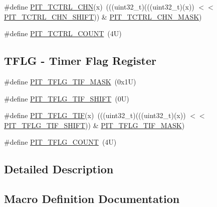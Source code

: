 \begin{DoxyCompactItemize}
\item 
\#define \mbox{\hyperlink{group___p_i_t___register___masks_gaeab3c9394c0312620a55449b2daeeaf8}{P\+I\+T\+\_\+\+T\+C\+T\+R\+L\+\_\+\+C\+HN}}(x)~(((uint32\+\_\+t)(((uint32\+\_\+t)(x)) $<$$<$ \mbox{\hyperlink{group___p_i_t___register___masks_ga9a1c8aa25a05c9b2c9503a003fa8d24d}{P\+I\+T\+\_\+\+T\+C\+T\+R\+L\+\_\+\+C\+H\+N\+\_\+\+S\+H\+I\+FT}})) \& \mbox{\hyperlink{group___p_i_t___register___masks_ga734e2e947c649d50b9ca46405e451c2b}{P\+I\+T\+\_\+\+T\+C\+T\+R\+L\+\_\+\+C\+H\+N\+\_\+\+M\+A\+SK}})
\item 
\#define \mbox{\hyperlink{group___p_i_t___register___masks_gaf5d79447f057663c2cf041cb472bd2b3}{P\+I\+T\+\_\+\+T\+C\+T\+R\+L\+\_\+\+C\+O\+U\+NT}}~(4\+U)
\end{DoxyCompactItemize}
\subsection*{T\+F\+LG -\/ Timer Flag Register}
\begin{DoxyCompactItemize}
\item 
\#define \mbox{\hyperlink{group___p_i_t___register___masks_ga9de8d708b43c9ca35df26c7b43f09769}{P\+I\+T\+\_\+\+T\+F\+L\+G\+\_\+\+T\+I\+F\+\_\+\+M\+A\+SK}}~(0x1\+U)
\item 
\#define \mbox{\hyperlink{group___p_i_t___register___masks_gaf6f5ddca2193ed04bc61bc3e899f5ced}{P\+I\+T\+\_\+\+T\+F\+L\+G\+\_\+\+T\+I\+F\+\_\+\+S\+H\+I\+FT}}~(0\+U)
\item 
\#define \mbox{\hyperlink{group___p_i_t___register___masks_gae5a66a0689241a2d1f52b5c989c81b6b}{P\+I\+T\+\_\+\+T\+F\+L\+G\+\_\+\+T\+IF}}(x)~(((uint32\+\_\+t)(((uint32\+\_\+t)(x)) $<$$<$ \mbox{\hyperlink{group___p_i_t___register___masks_gaf6f5ddca2193ed04bc61bc3e899f5ced}{P\+I\+T\+\_\+\+T\+F\+L\+G\+\_\+\+T\+I\+F\+\_\+\+S\+H\+I\+FT}})) \& \mbox{\hyperlink{group___p_i_t___register___masks_ga9de8d708b43c9ca35df26c7b43f09769}{P\+I\+T\+\_\+\+T\+F\+L\+G\+\_\+\+T\+I\+F\+\_\+\+M\+A\+SK}})
\item 
\#define \mbox{\hyperlink{group___p_i_t___register___masks_ga7d2129ae649e32ec8c7e6804ba6b6551}{P\+I\+T\+\_\+\+T\+F\+L\+G\+\_\+\+C\+O\+U\+NT}}~(4\+U)
\end{DoxyCompactItemize}


\subsection{Detailed Description}


\subsection{Macro Definition Documentation}
\mbox{\label{group___p_i_t___register___masks_gaf181c9e6602b6432a0bf1a9243808968}} 
